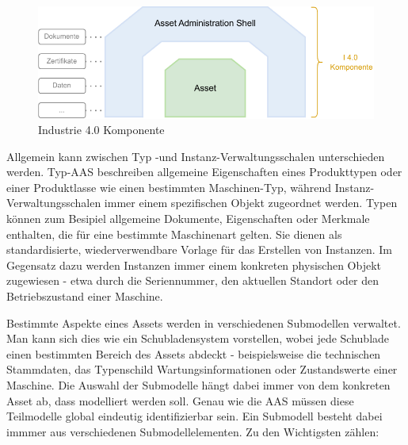 \vspace{2em}
\begin{figure}[htbp]
    \centering
    \includegraphics[width=1\textwidth]{Bilder/i4_komponente_neu.pdf}
    \caption{Industrie 4.0 Komponente}
    \label{fig:klassifizierungDT}
\end{figure}
Allgemein kann zwischen Typ -und Instanz-Verwaltungsschalen unterschieden werden.
Typ-AAS beschreiben allgemeine Eigenschaften eines Produkttypen oder einer Produktlasse wie einen bestimmten Maschinen-Typ, während Instanz-Verwaltungsschalen immer einem spezifischen Objekt zugeordnet werden.
Typen können zum Besipiel allgemeine Dokumente, Eigenschaften oder Merkmale enthalten, die für eine bestimmte Maschinenart gelten.
Sie dienen als standardisierte, wiederverwendbare Vorlage für das Erstellen von Instanzen.
Im Gegensatz dazu werden Instanzen immer einem konkreten physischen Objekt zugewiesen - etwa durch die Seriennummer, den aktuellen Standort oder den Betriebszustand einer Maschine.

Bestimmte Aspekte eines Assets werden in verschiedenen Submodellen verwaltet.
Man kann sich dies wie ein Schubladensystem vorstellen, wobei jede Schublade einen bestimmten Bereich des Assets abdeckt - beispielsweise die technischen Stammdaten, das Typenschild Wartungsinformationen oder Zustandswerte einer Maschine.
Die Auswahl der Submodelle hängt dabei immer von dem konkreten Asset ab, dass modelliert werden soll.
Genau wie die AAS müssen diese Teilmodelle global eindeutig identifizierbar sein.
Ein Submodell besteht dabei immmer aus verschiedenen Submodellelementen. Zu den Wichtigsten zählen:

